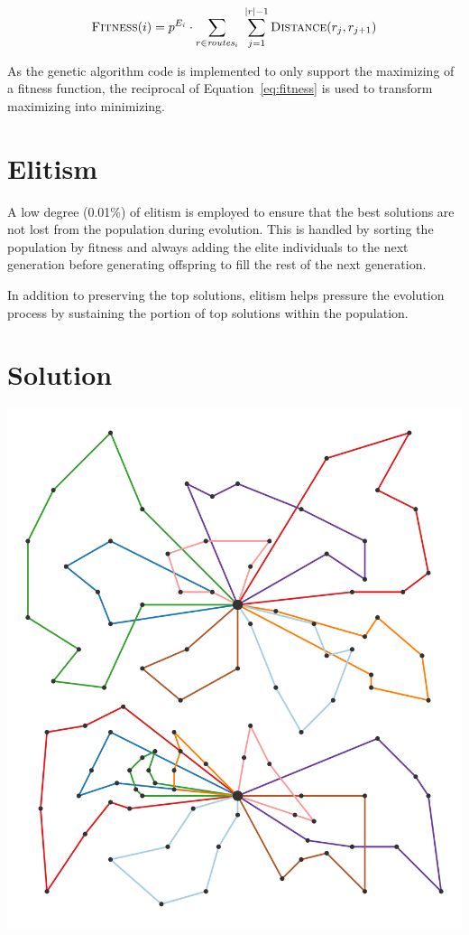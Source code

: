 \documentclass[paper=a4, fontsize=9pt]{scrartcl}
\begin{document}
\begin{multicols}{2}
\begin{equation}
\textsc{Fitness}(i) = p^{E_i} \cdot \sum_{r \in \textit{routes}_i}~\sum_{j=1}^{\vert{} r \vert{} - 1} \textsc{Distance}(r_j, r_{j+1})
\label{eq:fitness}
\end{equation}

As the genetic algorithm code is implemented to only support the maximizing of a fitness function, the reciprocal of Equation~\ref{eq:fitness} is used to transform maximizing into minimizing.

\section*{Elitism}

A low degree (0.01\%) of elitism is employed to ensure that the best solutions are not lost from the population during evolution. This is handled by sorting the population by fitness and always adding the elite individuals to the next generation before generating offspring to fill the rest of the next generation.

In addition to preserving the top solutions, elitism helps pressure the evolution process by sustaining the portion of top solutions within the population.

\section*{Solution}

{
\vspace{0.3cm}
\centering
\includegraphics[scale=0.1]{figures/solution.pdf}
\label{figure:flatland_baseline}
\vspace{0.3cm}
}


\end{multicols}
\end{document}
